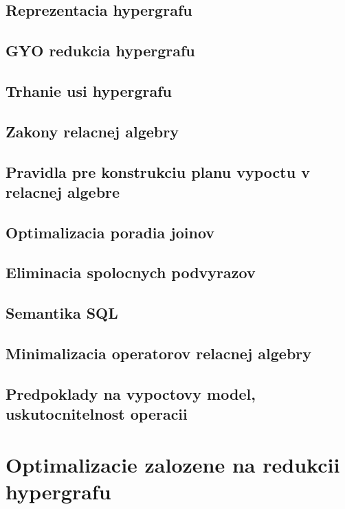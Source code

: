 \documentclass[12pt,a4paper]{article}
\begin{document}
\subsection{Reprezentacia hypergrafu}

\subsection{GYO redukcia hypergrafu}

\subsection{Trhanie usi hypergrafu}

\subsection{Zakony relacnej algebry}

\subsection{Pravidla pre konstrukciu planu vypoctu v relacnej algebre}

\subsection{Optimalizacia poradia joinov}

\subsection{Eliminacia spolocnych podvyrazov}

\subsection{Semantika SQL}

\subsection{Minimalizacia operatorov relacnej algebry}

\subsection{Predpoklady na vypoctovy model, uskutocnitelnost operacii}

\section{Optimalizacie zalozene na redukcii hypergrafu}
\end{document}
